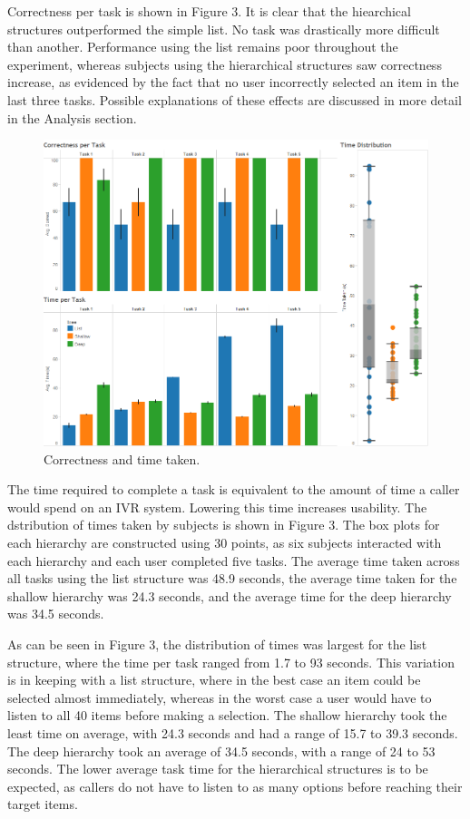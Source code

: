 \documentclass{sigchi}
\begin{document}
Correctness per task is shown in Figure 3. It is clear that the hiearchical structures outperformed the simple list. No task was drastically more difficult than another. Performance using the list remains poor throughout the experiment, whereas subjects using the hierarchical structures saw correctness increase, as evidenced by the fact that no user incorrectly selected an item in the last three tasks. Possible explanations of these effects are discussed in more detail in the Analysis section.

\begin{figure}[!h]
    \centering
    \includegraphics[width=0.9\columwidth]{fig_CorrectnessAndTime}
    \caption{Correctness and time taken.}
    \label{fig: Figure3}
\end{figure}

The time required to complete a task is equivalent to the amount of time a caller would spend on an IVR system. Lowering this time increases usability. The dstribution of times taken by subjects is shown in Figure 3. The box plots for each hierarchy are constructed using 30 points, as six subjects interacted with each hierarchy and each user completed five tasks. The average time taken across all tasks using the list structure was 48.9 seconds, the average time taken for the shallow hierarchy was 24.3 seconds, and the average time for the deep hierarchy was 34.5 seconds.

As can be seen in Figure 3, the distribution of times was largest for the list structure, where the time per task ranged from 1.7 to 93 seconds. This variation is in keeping with a list structure, where in the best case an item could be selected almost immediately, whereas in the worst case a user would have to listen to all 40 items before making a selection. The shallow hierarchy took the least time on average, with 24.3 seconds and had a range of 15.7 to 39.3 seconds. The deep hierarchy took an average of 34.5 seconds, with a range of 24 to 53 seconds. The lower average task time for the hierarchical structures is to be expected, as callers do not have to listen to as many options before reaching their target items.
\end{document}
